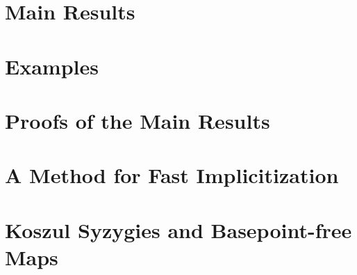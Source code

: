\documentclass[phd,tocprelim]{cornell}
\numberwithin{first}{chapter}
\begin{document}
\chapter{Main Results}
\label{ch:main-results}


\chapter{Examples}
\label{ch:examples}


\chapter{Proofs of the Main Results}
\label{ch:main-proofs}


\chapter{A Method for Fast Implicitization}
\label{ch:fast-method}


\chapter{Koszul Syzygies and Basepoint-free Maps}
\label{ch:koszul-bpf}


% 



\end{document}
